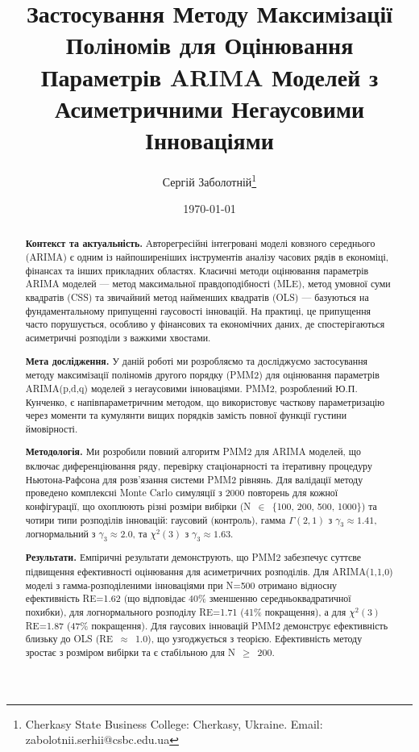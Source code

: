 \documentclass[12pt,a4paper]{article}
\title{Застосування Методу Максимізації Поліномів для Оцінювання Параметрів ARIMA Моделей з Асиметричними Негаусовими Інноваціями}
\author{Сергій Заболотній\thanks{Cherkasy State Business College: Cherkasy, Ukraine. Email: zabolotnii.serhii@csbc.edu.ua}}
\date{\today}
\begin{document}
\maketitle

\begin{abstract}

\textbf{Контекст та актуальність.} Авторегресійні інтегровані моделі ковзного середнього (ARIMA) є одним із найпоширеніших інструментів аналізу часових рядів в економіці, фінансах та інших прикладних областях. Класичні методи оцінювання параметрів ARIMA моделей --- метод максимальної правдоподібності (MLE), метод умовної суми квадратів (CSS) та звичайний метод найменших квадратів (OLS) --- базуються на фундаментальному припущенні гаусовості інновацій. На практиці, це припущення часто порушується, особливо у фінансових та економічних даних, де спостерігаються асиметричні розподіли з важкими хвостами.

\textbf{Мета дослідження.} У даній роботі ми розробляємо та досліджуємо застосування методу максимізації поліномів другого порядку (PMM2) для оцінювання параметрів ARIMA(p,d,q) моделей з негаусовими інноваціями. PMM2, розроблений Ю.П. Кунченко, є напівпараметричним методом, що використовує часткову параметризацію через моменти та кумулянти вищих порядків замість повної функції густини ймовірності.

\textbf{Методологія.} Ми розробили повний алгоритм PMM2 для ARIMA моделей, що включає диференціювання ряду, перевірку стаціонарності та ітеративну процедуру Ньютона-Рафсона для розв'язання системи PMM2 рівнянь. Для валідації методу проведено комплексні Monte Carlo симуляції з 2000 повторень для кожної конфігурації, що охоплюють різні розміри вибірки (N~$\in$~\{100, 200, 500, 1000\}) та чотири типи розподілів інновацій: гаусовий (контроль), гамма $\Gamma(2,1)$ з $\gamma_3 \approx 1.41$, логнормальний з $\gamma_3 \approx 2.0$, та $\chi^2(3)$ з $\gamma_3 \approx 1.63$.

\textbf{Результати.} Емпіричні результати демонструють, що PMM2 забезпечує суттєве підвищення ефективності оцінювання для асиметричних розподілів. Для ARIMA(1,1,0) моделі з гамма-розподіленими інноваціями при N=500 отримано відносну ефективність RE=1.62 (що відповідає 40\% зменшенню середньоквадратичної похибки), для логнормального розподілу RE=1.71 (41\% покращення), а для $\chi^2(3)$ RE=1.87 (47\% покращення). Для гаусових інновацій PMM2 демонструє ефективність близьку до OLS (RE~$\approx$~1.0), що узгоджується з теорією. Ефективність методу зростає з розміром вибірки та є стабільною для N~$\geq$~200.


\end{abstract}
\end{document}
